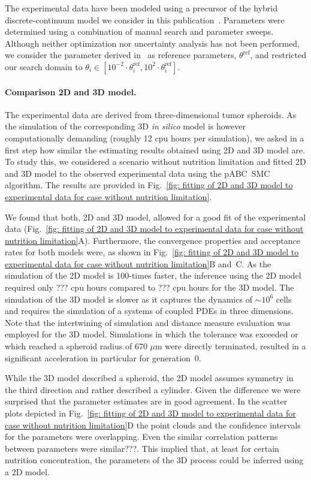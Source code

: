\documentclass[10pt,letterpaper]{article}
\newcommand{\jh}[1]{{\color{red}#1}}
\newcommand{\nj}[1]{{\color{blue}#1}}
\begin{document}
The experimental data have been modeled using a precursor of the hybrid discrete-continuum model we consider in this publication~\cite{JagiellaMul2015}. Parameters were determined using a combination of manual search and parameter sweeps. Although neither optimization nor uncertainty analysis has not been performed, we consider the parameter derived in~\cite{JagiellaMul2015} as reference parameters, $\theta^{\text{ref}}$, and restricted our search domain to $\theta_i \in [10^{-2} \cdot \theta_i^{\text{ref}},10^{2} \cdot\theta_i^{\text{ref}}]$.

\paragraph*{Comparison 2D and 3D model.}
The experimental data are derived from three-dimensional tumor spheroids. As the simulation of the corresponding 3D \textit{in silico} model is however computationally demanding (roughly 12 cpu hours per simulation), we asked in a first step how similar the estimating results obtained using 2D and 3D model are. To study this, we considered a scenario without nutrition limitation and fitted 2D and 3D model to the observed experimental data using the pABC~SMC algorithm. The results are provided in Fig.~\ref{fig: fitting of 2D and 3D model to experimental data for case without nutrition limitation}.

We found that both, 2D and 3D model, allowed for a good fit of the experimental data (Fig.~\ref{fig: fitting of 2D and 3D model to experimental data for case without nutrition limitation}A). Furthermore, the convergence properties and acceptance rates for both models were, as shown in Fig.~\ref{fig: fitting of 2D and 3D model to experimental data for case without nutrition limitation}B and~C. As the simulation of the 2D model is \nj{100-times} faster, the inference using the 2D model required only \jh{???} cpu hours compared to \jh{???} cpu hours for the 3D model. The simulation of the 3D model is slower as it captures the dynamics of \nj{$\sim10^6$ cells} and requires the simulation of a systems of coupled PDEs in three dimensions. Note that the intertwining of simulation and distance measure evaluation was employed for the 3D model. Simulations in which the tolerance was exceeded or which reached a spheroid radius of \nj{670 $\mu$m} were directly terminated, resulted in a significant acceleration in particular for generation~0.

While the 3D model described a spheroid, the 2D model assumes symmetry in the third direction and rather described a cylinder. Given the difference we were surprised that the parameter estimates are in good agreement. In the scatter plots depicted in Fig.~\ref{fig: fitting of 2D and 3D model to experimental data for case without nutrition limitation}D the point clouds and the confidence intervals for the parameters were overlapping. Even the similar correlation patterns between parameters were similar\jh{???}. This implied that, at least for certain nutrition concentration, the parameters of the 3D process could be inferred using a 2D model.
\end{document}
